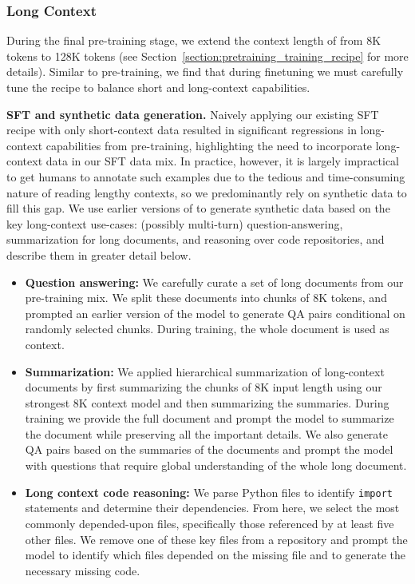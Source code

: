 \documentclass[dvipsnames]{fairmeta}
\begin{document}
\subsubsection{Long Context}
\label{subsubsec:long_context}

During the final pre-training stage, we extend the context length of \llamathree from 8K tokens to 128K tokens (see Section~\ref{section:pretraining_training_recipe} for more details). Similar to pre-training, we find that during finetuning we must carefully tune the recipe to balance short and long-context capabilities.

\textbf{SFT and synthetic data generation.} 
Naively applying our existing SFT recipe with only short-context data resulted in significant regressions in long-context capabilities from pre-training, highlighting the need to incorporate long-context data in our SFT data mix. In practice, however, it is largely impractical to get humans to annotate such examples due to the tedious and time-consuming nature of reading lengthy contexts, so we predominantly rely on synthetic data to fill this gap.
We use earlier versions of \llamathree to generate synthetic data based on the key long-context use-cases: (possibly multi-turn) question-answering, summarization for long documents, and reasoning over code repositories, and describe them in greater detail below.

\begin{itemize}
    \item \textbf{Question answering:} We carefully curate a set of long documents from our pre-training mix. We split these documents into chunks of 8K tokens, and prompted an earlier version of the \llamathree model to generate QA pairs conditional on randomly selected chunks. During training, the whole document is used as context.

    \item \textbf{Summarization:} We applied hierarchical summarization of long-context documents by first summarizing the chunks of 8K input length using our strongest \llamathree 8K context model and then summarizing the summaries. During training we provide the full document and prompt the model to summarize the document while preserving all the important details. We also generate QA pairs based on the summaries of the documents and prompt the model with questions that require global understanding of the whole long document.

    \item \textbf{Long context code reasoning:} We parse Python files to identify \texttt{import} statements and determine their dependencies. From here, we select the most commonly depended-upon files, specifically those referenced by at least five other files. We remove one of these key files from a repository and prompt the model to identify which files depended on the missing file and to generate the necessary missing code.
\end{itemize}
\end{document}
